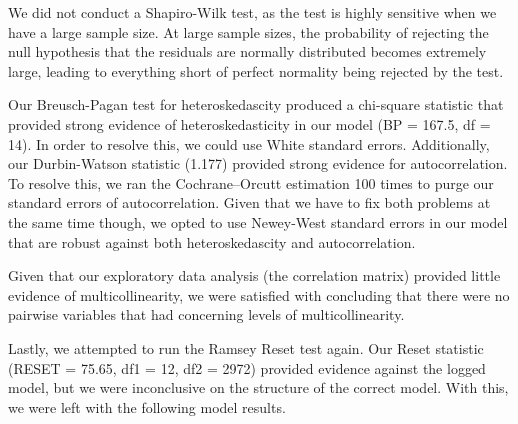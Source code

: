 \documentclass[10.7pt]{article} %
\begin{document}
\begin{figure} [h]
    \centering
    \qquad
    \label{fig:example}%
\end{figure}

We did not conduct a Shapiro-Wilk test, as the test is highly sensitive when we have a large sample size. At large sample sizes, the probability of rejecting the null hypothesis that the residuals are normally distributed becomes extremely large, leading to everything short of perfect normality being rejected by the test. 

Our Breusch-Pagan test for heteroskedascity produced a chi-square statistic that provided strong evidence of heteroskedasticity in our model (BP = 167.5, df = 14). In order to resolve this, we could use White standard errors. Additionally, our Durbin-Watson statistic (1.177) provided strong evidence for autocorrelation. To resolve this, we ran the Cochrane–Orcutt estimation 100 times to purge our standard errors of autocorrelation. Given that we have to fix both problems at the same time though, we opted to use Newey-West standard errors in our model that are robust against both heteroskedascity and autocorrelation. 

Given that our exploratory data analysis (the correlation matrix) provided little evidence of multicollinearity, we were satisfied with concluding that there were no pairwise variables that had concerning levels of multicollinearity. 

Lastly, we attempted to run the Ramsey Reset test again. Our Reset statistic (RESET = 75.65, df1 = 12, df2 = 2972) provided evidence against the logged model, but we were inconclusive on the structure of the correct model. With this, we were left with the following model results.
\end{document}
